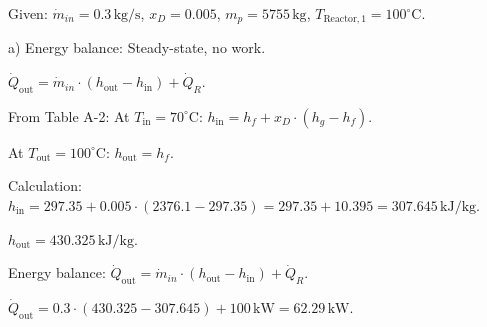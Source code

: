 Given:  
\( \dot{m}_{in} = 0.3 \, \text{kg/s} \), \( x_D = 0.005 \), \( m_p = 5755 \, \text{kg} \), \( T_{\text{Reactor},1} = 100^\circ \text{C} \).  

a) Energy balance:  
Steady-state, no work.  

\( \dot{Q}_{\text{out}} = \dot{m}_{in} \cdot (h_{\text{out}} - h_{\text{in}}) + \dot{Q}_R \).  

From Table A-2:  
At \( T_{\text{in}} = 70^\circ \text{C} \):  
\( h_{\text{in}} = h_f + x_D \cdot (h_g - h_f) \).  

At \( T_{\text{out}} = 100^\circ \text{C} \):  
\( h_{\text{out}} = h_f \).  

Calculation:  
\( h_{\text{in}} = 297.35 + 0.005 \cdot (2376.1 - 297.35) = 297.35 + 10.395 = 307.645 \, \text{kJ/kg} \).  

\( h_{\text{out}} = 430.325 \, \text{kJ/kg} \).  

Energy balance:  
\( \dot{Q}_{\text{out}} = \dot{m}_{in} \cdot (h_{\text{out}} - h_{\text{in}}) + \dot{Q}_R \).  

\( \dot{Q}_{\text{out}} = 0.3 \cdot (430.325 - 307.645) + 100 \, \text{kW} = 62.29 \, \text{kW} \).